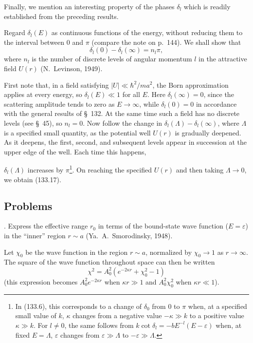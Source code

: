 Finally, we mention an interesting property of the phases $\delta_l$ which is
readily established from the preceding results.

Regard $\delta_l(E)$ as continuous functions of the energy, without reducing
them to the interval between 0 and $\pi$ (compare the note on p.~144). We
shall show that
\begin{equation}
 \delta_l(0)-\delta_l(\infty)=n_l\pi,
 \tag{133.17}
\end{equation}
where $n_l$ is the number of discrete levels of angular momentum $l$ in the
attractive field $U(r)$ (N.~Levinson, 1949).

First note that, in a field satisfying $|U|\ll\hbar^2/ma^2$, the Born
approximation applies at every energy, so $\delta_l(E)\ll1$ for all $E$. Here
$\delta_l(\infty)=0$, since the scattering amplitude tends to zero as
$E\to\infty$, while $\delta_l(0)=0$ in accordance with the general results of
\S~132. At the same time such a field has no discrete levels (see \S~45), so
$n_l=0$. Now follow the change in
$\delta_l(\Lambda)-\delta_l(\infty)$, where $\Lambda$ is a specified small
quantity, as the potential well $U(r)$ is gradually deepened. As it deepens,
the first, second, and subsequent levels appear in succession at the upper
edge of the well. Each time this happens,

$\delta_l(\Lambda)$ increases by $\pi$\footnote{In (133.6), this corresponds
to a change of $\delta_0$ from 0 to $\pi$ when, at a specified small value of
$k$, $\kappa$ changes from a negative value $-\kappa\gg k$ to a positive
value $\kappa\gg k$. For $l\ne0$, the same follows from
$k\cot\delta_l=-bE^{-l}(E-\varepsilon)$ when, at fixed $E=\Lambda$,
$\varepsilon$ changes from $\varepsilon\gg\Lambda$ to
$-\varepsilon\gg\Lambda$.}. On reaching the specified $U(r)$ and then taking
$\Lambda\to0$, we obtain (133.17).

\subsection*{Problems}

. Express the effective range $r_0$ in terms of the bound-state
wave function ($E=\varepsilon$) in the ``inner'' region $r\sim a$
(Ya.~A.~Smorodinsky, 1948).

\SolutionHeading Let $\chi_0$ be the wave function in the region $r\sim a$,
normalized by $\chi_0\to1$ as $r\to\infty$. The square of the wave function
throughout space can then be written
\[
 \chi^2=A_0^2(e^{-2\kappa r}+\chi_0^2-1)
\]
(this expression becomes $A_0^2e^{-2\kappa r}$ when $\kappa r\gg1$ and
$A_0^2\chi_0^2$ when $\kappa r\ll1$).

